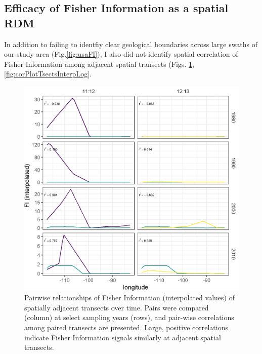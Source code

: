 \documentclass[12pt,twoside,openany]{reedthesis}
\begin{document}
\subsection{Efficacy of Fisher Information as a spatial
RDM}\label{efficacy-of-fisher-information-as-a-spatial-rdm-1}

In addition to failing to identfiy clear geological boundaries across
large swaths of our study area (Fig.\ref{fig:usaFI}), I also did not
identify spatial correlation of Fisher Information among adjacent
spatial transects (Figs. \ref{fig:corPlotTsectsInterp},
\ref{fig:corPlotTsectsInterpLog}.
\begin{figure}
\includegraphics[width=0.95\linewidth]{./chapterFiles/fisherSpatial/figures/figsCalledInDiss/interpolated_FI_corplotSelectTransects_East-West} \caption{Pairwise relationships of Fisher Information (interpolated values) of spatially adjacent transects over time. Pairs were compared (column) at select sampling years (rows), and pair-wise correlations among paired transects are presented. Large, positive correlations indicate Fisher Information signals similarly at adjacent spatial transects.}\label{fig:corPlotTsectsInterp}
\end{figure}
\end{document}
